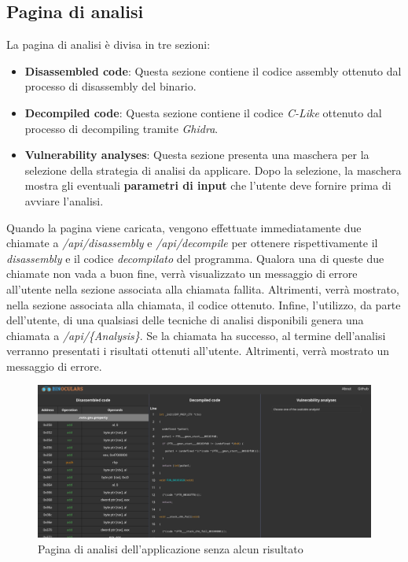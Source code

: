 \documentclass[../main.tex]{subfiles}
\begin{document}
\subsection{Pagina di analisi}
La pagina di analisi è divisa in tre sezioni:
\begin{itemize}
    \item \textbf{Disassembled code}: Questa sezione contiene  il codice assembly ottenuto dal processo di disassembly del binario.
    \item \textbf{Decompiled code}: Questa sezione contiene il codice \textit{C-Like} ottenuto dal processo di decompiling tramite \textit{Ghidra}.
    \item \textbf{Vulnerability analyses}: Questa sezione presenta una maschera per la selezione della strategia di analisi da applicare.
    Dopo la selezione, la maschera mostra gli eventuali \textbf{parametri di input} che l'utente deve fornire prima di avviare l'analisi.
\end{itemize}
Quando la pagina viene caricata, vengono effettuate immediatamente due chiamate a \textit{/api/disassembly} e \textit{/api/decompile} per ottenere rispettivamente il \textit{disassembly} e il codice \textit{decompilato}
del programma. Qualora una di queste due chiamate non vada a buon fine, verrà visualizzato un messaggio di errore all'utente nella sezione associata alla chiamata fallita.
Altrimenti, verrà mostrato, nella sezione associata alla chiamata, il codice ottenuto.
Infine, l'utilizzo, da parte dell'utente, di una qualsiasi delle tecniche di analisi disponibili genera una chiamata a \textit{/api/\{Analysis\}}. Se la chiamata ha successo, al termine dell'analisi
verranno presentati i risultati ottenuti all'utente. Altrimenti, verrà mostrato un messaggio di errore.
\begin{figure}[H]
    \centering
    \includegraphics[width = \textwidth]{../images/analysis_page_no_results.png}
    \caption{Pagina di analisi dell'applicazione senza alcun risultato}
\end{figure}
\end{document}
